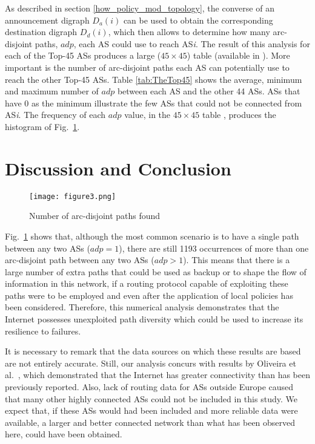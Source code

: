 \documentclass[10pt,final,journal]{IEEEtran}
\begin{document}
As described in section \ref{how_policy_mod_topology}, the converse of an announcement digraph $D_{a}\left(i\right)$ can be used to obtain the corresponding destination digraph $D_{d}\left(i\right)$, which then allows to determine how many arc-disjoint paths, $adp$, each AS could use to reach AS\textit{i}. The result of this analysis for each of the Top-45 ASs produces a  large ($45 \times 45$) table (available in \cite{Arjona-Villicana2009}). More important is the number of arc-disjoint paths each AS can potentially use to reach the other Top-45 ASs. Table \ref{tab:TheTop45} shows the average, minimum and maximum number of $adp$ between each AS and the other 44 ASs. ASs that have 0 as the minimum illustrate the few ASs that could not be connected from AS\textit{i}. The frequency of each $adp$ value, in the $45 \times 45$ table \cite{Arjona-Villicana2009}, produces the histogram of Fig.~\ref{fig:num_arc_disj_paths}.

\section{Discussion and Conclusion}\label{discussion_and_conlcusion}

\begin{figure}[!t]
	\centering
		\texttt{[image: figure3.png]}
	\caption{Number of arc-disjoint paths found}
	\label{fig:num_arc_disj_paths}
\end{figure}

Fig.~\ref{fig:num_arc_disj_paths} shows that, although the most common scenario is to have a single path between any two ASs ($adp=1$), there are still 1193 occurrences of more than one arc-disjoint path between any two ASs ($adp>1$). This means that there is a large number of extra paths that could be used as backup or to shape the flow of information in this network, if a routing protocol capable of exploiting these paths were to be employed and even after the application of local policies has been considered. Therefore, this numerical analysis demonstrates that the Internet possesses unexploited path diversity which could be used to increase its resilience to failures.

It is necessary to remark that the data sources on which these results are based are not entirely accurate. Still, our analysis concurs with results by Oliveira et al.~\cite{Oliveira2008}, which demonstrated that the Internet has greater connectivity than has been previously reported. Also, lack of routing data for ASs outside Europe caused that many other highly connected ASs could not be included in this study. We expect that, if these ASs would had been included and more reliable data were available, a larger and better connected network than what has been observed here, could have been obtained.
\end{document}
